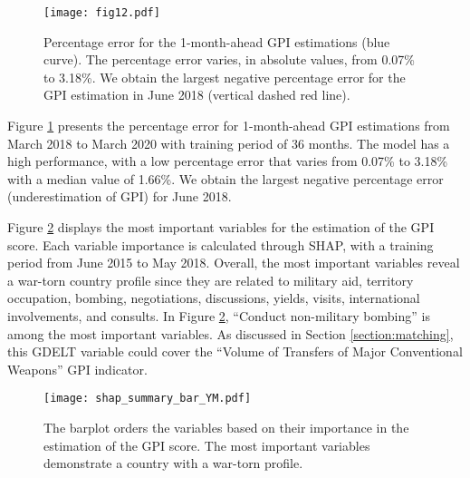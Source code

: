 \documentclass{bmcart}
\begin{document}
\begin{figure}[h!]
\centering
\texttt{[image: fig12.pdf]}
  \caption{
      Percentage error for the 1-month-ahead GPI estimations (blue curve). The percentage error varies, in absolute values, from 0.07\% to 3.18\%. We obtain the largest negative percentage error for the GPI estimation in June 2018 (vertical dashed red line).}
\label{fig:YM_perc_error}
\end{figure}

Figure \ref{fig:YM_perc_error} presents the percentage error for 1-month-ahead GPI estimations from March 2018 to March 2020 with training period of 36 months. 
The model has a high performance, with a low percentage error that varies from 0.07\% to 3.18\%  with a median value of 1.66\%. 
We obtain the largest negative percentage error (underestimation of GPI) for June 2018.

Figure \ref{fig:barplot_YM} displays the most important variables for the estimation of the GPI score. Each variable importance is calculated through SHAP, with a training period from June 2015 to May 2018. 
Overall, the most important variables reveal a war-torn country profile since they are related to military aid, territory occupation, bombing, negotiations, discussions, yields, visits, international involvements, and consults.
In Figure \ref{fig:barplot_YM}, ``Conduct non-military bombing'' is among the most important variables. As discussed in Section \ref{section:matching}, this GDELT variable could cover the ``Volume of Transfers of Major Conventional Weapons'' GPI indicator.

\begin{figure}[h!]
\centering
\texttt{[image: shap\_summary\_bar\_YM.pdf]}
  \caption{
      The barplot orders the variables based on their importance in the estimation of the GPI score. The most important variables demonstrate a country with a war-torn profile.}
\label{fig:barplot_YM}
\end{figure}
\end{document}
